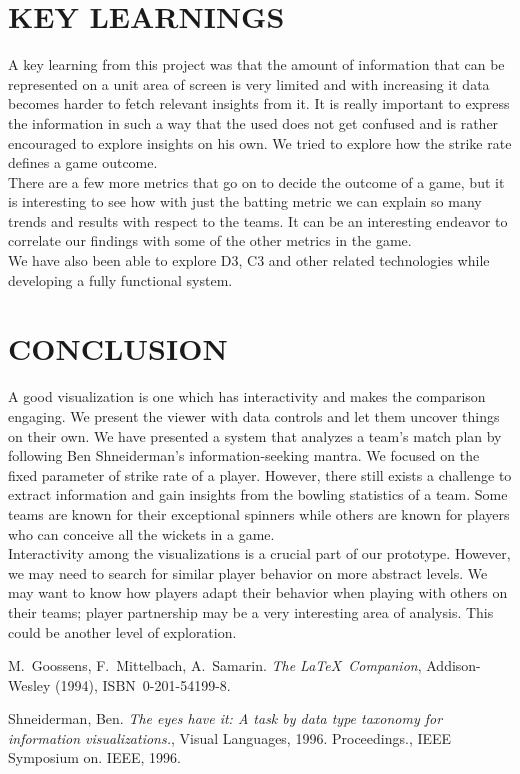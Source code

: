 \documentclass[letterpaper,10pt]{article}
\begin{document}
\begin{multicols}{2}
\section{KEY LEARNINGS}
A key learning from this project was that the amount of information that can be represented on a unit area of screen is very limited and with increasing it data becomes harder to fetch relevant insights from it. It is really important to express the information in such a way that the used does not get confused and is rather encouraged to explore insights on his own. We tried to explore how the strike rate defines a game outcome.\\
There are a few more metrics that go on to decide the outcome of a game, but it is interesting to see how with just the batting metric we can explain so many trends and results with respect to the teams. It can be an interesting endeavor to correlate our findings with some of the other metrics in the game.\\
We have also been able to explore D3, C3 and other related technologies while developing a fully functional system.


%
%

\section{CONCLUSION}
A good visualization is one which has interactivity and makes the comparison engaging. We present the viewer with data controls and let them uncover things on their own. We have presented a system that analyzes a team’s match plan by following Ben Shneiderman's information-seeking mantra\cite{mantra}. We focused on the fixed parameter of strike rate of a player. However, there still exists a challenge to extract information and gain insights from the bowling statistics of a team. Some teams are known for their exceptional spinners while others are known for players who can conceive all the wickets in a game. \\
Interactivity among the visualizations is a crucial part of our prototype. However, we may need to search for  similar  player  behavior  on  more abstract levels. We may want to know how players adapt their behavior when playing with others on their teams; player partnership may be a very interesting area of analysis. This could be another level of exploration.

\begin{thebibliography}{9}
\footnotesize
\setlength{\itemsep}{0pt}
M.~Goossens, F.~Mittelbach, A.~Samarin. \emph{The \LaTeX\ Companion},
Addison-Wesley (1994), ISBN~0-201-54199-8.

Shneiderman, Ben. \emph{The eyes have it: A task by data type taxonomy for information visualizations.}, Visual Languages, 1996. Proceedings., IEEE Symposium on. IEEE, 1996.

\end{thebibliography}



\end{multicols}
\end{document}
